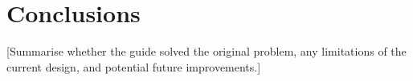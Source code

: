 \section{Conclusions}


[Summarise whether the guide solved the original problem, any
limitations of the current design, and potential future improvements.]

